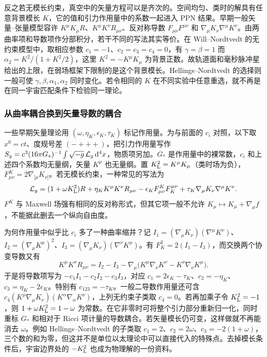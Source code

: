 反之若无模长约束，真空中的矢量方程可以是齐次的。空间均匀、类时的解具有任意背景模长 $K$，它的值和引力作用量中的系数一起进入 PPN 结果。早期一般矢量--张量模型容许 $K^\mu K_\mu R$、$K^\mu K^\nu R_{\mu\nu}$、反对称导数 $F_{\mu\nu}F^{\mu\nu}$ 和 $\nabla_\mu K_\nu\nabla^\mu K^\nu$。由两曲率项和导数项作分部积分，若干不同的写法其实等价。在 Will--Nordtvedt 的无约束模型中，取相应参数 $c_1=-1$、$c_2=c_3=c_4=0$，有 $\gamma=\beta=1$ 而 $\alpha_2=K^2/(1+K^2/2)$，这里 $K^2=-K^\mu K_\mu$ 为背景正数。故轨道面和毫秒脉冲星给出的上限，在弱场框架下限制的是这个背景模长。Hellings--Nordtvedt 的选择则一般可使 $\gamma,\beta,\alpha_1,\alpha_2$ 同时变化。若令相同的 $K$ 在不同实验中任意重选，就不再是在同一宇宙匹配条件下检验同一理论。

\subsubsection{从曲率耦合换到矢量导数的耦合}

一些早期矢量理论用 $(\omega,\eta_K,\epsilon_K,\tau_K)$ 标记作用量。为与前面的 $c_i$ 对照，以下取 $x^0=ct$、度规号差 $(-+++)$，把引力作用量写作 $S_g=c^3(16\pi G_*)^{-1}\int\sqrt{-g}\,\mathcal L_g\,\dd^4x$，物质项另加。$G_*$ 是作用量中的裸常数，$c_i$ 和上述四个系数均无量纲，矢量 $K^\mu$ 也无量纲。置 $K^2_{\rm L}=K^\mu K_\mu$（类时场为负），$F^K_{\mu\nu}=2\nabla_{[\mu}K_{\nu]}$。若无模长约束，一种常见的写法为
\[
 \mathcal L_g=(1+\omega K^2_{\rm L})R+
     \eta_K K^\mu K^\nu R_{\mu\nu}
     -\epsilon_K F^K_{\mu\nu}F_K^{\mu\nu}
     +\tau_K\nabla_\mu K_\nu\nabla^\mu K^\nu .
\]
$F^K$ 与 Maxwell 场强有相同的反对称形式，但其它项一般不允许 $K_\mu\mapsto K_\mu+\nabla_\mu f$，不能据此删去一个纵向自由度。

为何作用量中似乎比 $c_i$ 多了一种曲率缩并？记 $I_1=(\nabla_\mu K_\nu)(\nabla^\mu K^\nu)$、$I_2=(\nabla_\mu K^\mu)^2$、$I_3=(\nabla_\mu K_\nu)(\nabla^\nu K^\mu)$。有 $F_K^2=2(I_1-I_3)$，而交换两个协变导数又有
\[
 K^\mu K^\nu R_{\mu\nu}
 = I_2-I_3-\nabla_\mu\big(K^\mu\nabla_\nu K^\nu
                          -K^\nu\nabla_\nu K^\mu\big).
\]
于是将导数项写为 $-c_1 I_1-c_2 I_2-c_3 I_3$，对应 $c_1=2\epsilon_K-\tau_K$、$c_2=-\eta_K$、$c_3=\eta_K-2\epsilon_K$。特别有 $c_{123}=-\tau_K$。一般二导数作用量还可含 $c_4(K^\mu\nabla_\mu K_\nu)(K^\alpha\nabla_\alpha K^\nu)$，上列无约束子类取 $c_4=0$。若再加乘子令 $K^2_{\rm L}=-1$，则 $1+\omega K^2_{\rm L}=1-\omega$ 为常数。在它非零时可将整个引力部分重新归一化，同时重标 $G_*$ 和相对于 Ricci 项计量的导数耦合。若矢量模长仍可变，这样做就不再能消去 $\omega$。例如 Hellings--Nordtvedt 的子类取 $c_1=2$、$c_2=2\omega$、$c_3=-2(1+\omega)$，三个数的和为零，但这并不是单位以太理论中可以直接代入的特殊点。去掉模长条件后，宇宙边界处的 $-K^2_{\rm L}$ 也成为物理解的一份资料。

